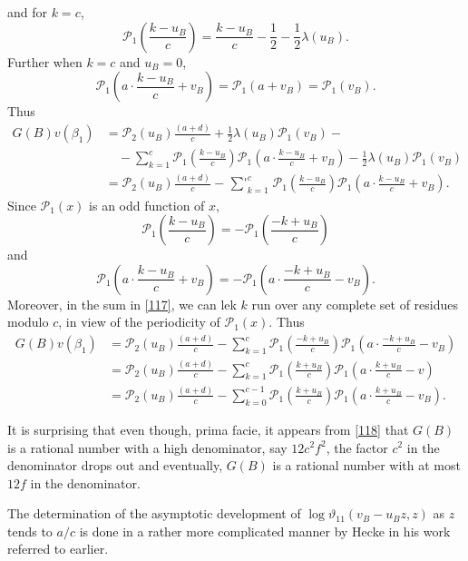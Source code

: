 and for $k=c$,
$$
\mathscr{P}_{1}\left(\frac{k-u_{B}}{c}\right)=\frac{k-u_{B}}{c}-\frac{1}{2}-\frac{1}{2}\lambda(u_{B}). 
$$
Further when $k=c$ and $u_{B}=0$,
$$
\mathscr{P}_{1}\left(a\cdot
\frac{k-u_{B}}{c}+v_{B}\right)=\mathscr{P}_{1}(a+v_{B})=\mathscr{P}_{1}(v_{B}).
$$
Thus 
\begin{align*}
G(B)v(\beta_{1}) &=
\mathscr{P}_{2}(u_{B})\frac{(a+d)}{c}+\frac{1}{2}\lambda(u_{B})\mathscr{P}_{1}(v_{B})-\\
&\quad
-\sum^{c}_{k=1}\mathscr{P}_{1}\left(\frac{k-u_{B}}{c}\right)\mathscr{P}_{1}\left(a\cdot
\frac{k-u_{B}}{c}+v_{B}\right)-\frac{1}{2}\lambda(u_{B})\mathscr{P}_{1}(v_{B})\\
&=
\mathscr{P}_{2}(u_{B})\frac{(a+d)}{c}-\mathop{{\sum}'}^{c}_{k=1}\mathscr{P}_{1}\left(\frac{k-u_{B}}{c}\right)\mathscr{P}_{1}\left(a\cdot
\frac{k-u_{B}}{c}+v_{B}\right).\tag{117}\label{117} 
\end{align*}
Since $\mathscr{P}_{1}(x)$ is an odd function of $x$,
$$
\mathscr{P}_{1}\left(\frac{k-u_{B}}{c}\right)=-\mathscr{P}_{1}\left(\frac{-k+u_{B}}{c}\right) 
$$
and
$$
\mathscr{P}_{1}\left(a\cdot
\frac{k-u_{B}}{c}+v_{B}\right)=-\mathscr{P}_{1}\left(a\cdot
\frac{-k+u_{B}}{c}-v_{B}\right).
$$
Moreover, in the sum in \eqref{117}, we can lek $k$ run over any
complete set of residues modulo $c$, in view of the periodicity of
$\mathscr{P}_{1}(x)$. Thus 
{\fontsize{10}{12}\selectfont
\begin{align*}
G(B)v(\beta_{1}) &=
\mathscr{P}_{2}(u_{B})\frac{(a+d)}{c}-\sum^{c}_{k=1}\mathscr{P}_{1}\left(\frac{-k+u_{B}}{c}\right)\mathscr{P}_{1}\left(a\cdot
\frac{-k+u_{B}}{c}-v_{B}\right)\\
&=
\mathscr{P}_{2}(u_{B})\frac{(a+d)}{c}-\sum^{c}_{k=1}\mathscr{P}_{1}\left(\frac{k+u_{B}}{c}\right)\mathscr{P}_{1}\left(a\cdot
\frac{k+u_{B}}{c}-v\right)\\
&=
\mathscr{P}_{2}(u_{B})\frac{(a+d)}{c}-\sum^{c-1}_{k=0}\mathscr{P}_{1}\left(\frac{k+u_{B}}{c}\right)\mathscr{P}_{1}\left(a\cdot
\frac{k+u_{B}}{c}-v_{B}\right).\tag{118}\label{118} 
\end{align*}}\pageoriginale

It is surprising that even though, prima facie, it appears from
\eqref{118} that $G(B)$ is a rational number with a high denominator,
say $12c^{2}f^{2}$, the factor $c^{2}$ in the denominator drops out
and eventually, $G(B)$ is a rational number with at most $12f$ in the
denominator.

The determination of the asymptotic development of
$\log\vartheta_{11}(v_{B}-u_{B}z,z)$ as $z$ tends to $a/c$ is done in
a rather more complicated manner by Hecke in his work referred to
earlier.

